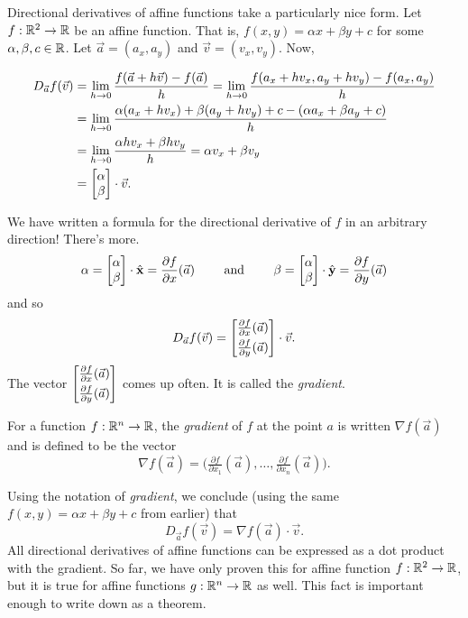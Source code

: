 Directional derivatives of affine functions take a particularly nice form.
Let $f:\mathbb{R}^2\to\mathbb{R}$ be an affine function.
That is, $f(x,y)=\alpha x+\beta y+c$ for some $\alpha,\beta,c\in\mathbb{R}$. 
Let $\vec a=(a_x,a_y)$ and $\vec v=(v_x,v_y)$.  Now,

\begin{align*}
	D_{\vec a}f(\vec v) &= \lim_{h\to0}\frac{f(\vec a+h\vec v)-f(\vec a)}{h}
	=\lim_{h\to0}\frac{f(a_x+hv_x, a_y+hv_y)-f(a_x,a_y)}{h}\\
	&=\lim_{h\to0}\frac{\alpha(a_x+hv_x)+\beta( a_y+hv_y)+c-(\alpha a_x+\beta a_y+c)}{h}\\
	&=\lim_{h\to0}\frac{\alpha hv_x+\beta hv_y}{h} = \alpha v_x+\beta v_y\\
	&=\mat{\alpha\\\beta}\cdot \vec v.
\end{align*}

We have written a formula for the directional derivative of $f$ in an arbitrary direction!  There's more.
\[
	\alpha = \mat{\alpha\\\beta}\cdot \xhat = \frac{\partial f}{\partial x}(\vec a)
	\qquad\text{ and }\qquad
	\beta = \mat{\alpha\\\beta}\cdot \yhat = \frac{\partial f}{\partial y}(\vec a)
\]
and so
\[
	D_{\vec a}f(\vec v) = \mat{\tfrac{\partial f}{\partial x}(\vec a)\\[3pt]\tfrac{\partial f}{\partial y}(\vec a)}
	\cdot \vec v.
\]
The vector $\mat{\tfrac{\partial f}{\partial x}(\vec a)\\[3pt]\tfrac{\partial f}{\partial y}(\vec a)}$ comes up often.
It is called the \emph{gradient}.

\begin{definition}[Gradient]
	For a function $f:\mathbb{R}^n\to\mathbb{R}$, the \emph{gradient} of $f$ at the point $a$ is
	written $\nabla f(\vec a)$ and is defined to be the vector
	\[
		\nabla f(\vec a) = \Big(\tfrac{\partial f}{\partial x_1}(\vec a),
		\ldots, \tfrac{\partial f}{\partial x_n}(\vec a) \Big).
	\]
\end{definition}

Using the notation of \emph{gradient}, 
we conclude (using the same $f(x,y)=\alpha x+\beta y+c$ from earlier) that
\begin{equation}
	\label{EQDIRDERIVGRAD}
	D_{\vec a}f(\vec v) = \nabla f(\vec a)\cdot \vec v.
\end{equation}
All directional derivatives of affine functions can be expressed as a dot product with
the gradient.  So far, we have only proven this for
affine function $f:\mathbb{R}^2\to\mathbb{R}$, but it is true for affine functions
$g:\mathbb{R}^n\to\mathbb{R}$ as well.  This fact is important enough to write down
as a theorem.

